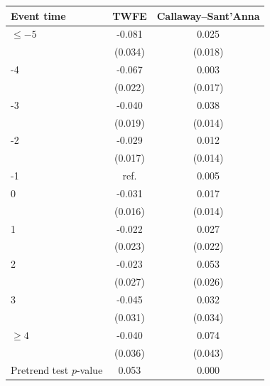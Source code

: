 \begin{tabular}{lcc}
\toprule
Event time & TWFE & Callaway--Sant'Anna \\
\midrule
\(\le -5\) & -0.081 &  0.025 \\
 & (0.034) & (0.018) \\
-4 & -0.067 &  0.003 \\
 & (0.022) & (0.017) \\
-3 & -0.040 &  0.038 \\
 & (0.019) & (0.014) \\
-2 & -0.029 &  0.012 \\
 & (0.017) & (0.014) \\
-1 & \multicolumn{1}{c}{ref.} &  0.005 \\
0 & -0.031 &  0.017 \\
 & (0.016) & (0.014) \\
1 & -0.022 &  0.027 \\
 & (0.023) & (0.022) \\
2 & -0.023 &  0.053 \\
 & (0.027) & (0.026) \\
3 & -0.045 &  0.032 \\
 & (0.031) & (0.034) \\
\(\ge 4\) & -0.040 &  0.074 \\
 & (0.036) & (0.043) \\
\midrule
Pretrend test \(p\)-value & 0.053 & 0.000 \\
\bottomrule
\end{tabular}
